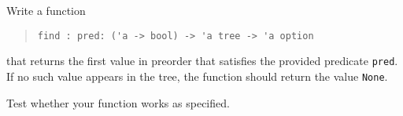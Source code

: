 Write a function
\begin{quote}
\lstinline{find : pred: ('a -> bool) -> 'a tree -> 'a option}
\end{quote}
that returns the first value in preorder that
satisfies the provided predicate \lstinline{pred}. If no such value appears in the
tree, the function should return the value \lstinline{None}. 

Test whether your function works as specified.

